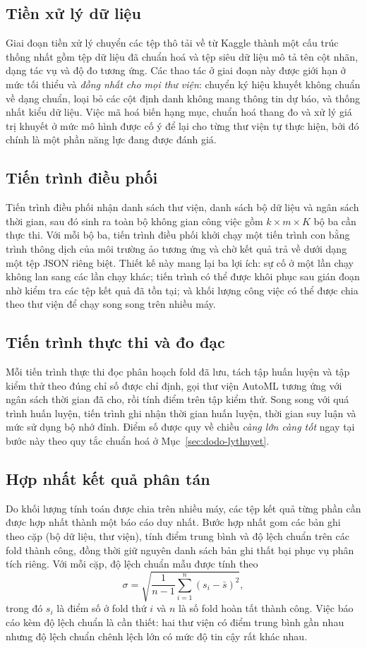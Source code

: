 \subsection{Tiền xử lý dữ liệu}
Giai đoạn tiền xử lý chuyển các tệp thô tải về từ Kaggle thành một cấu trúc thống
nhất gồm tệp dữ liệu đã chuẩn hoá và tệp siêu dữ liệu mô tả tên cột nhãn, dạng tác
vụ và độ đo tương ứng. Các thao tác ở giai đoạn này được giới hạn ở mức tối thiểu
và \emph{đồng nhất cho mọi thư viện}: chuyển ký hiệu khuyết không chuẩn về dạng
chuẩn, loại bỏ các cột định danh không mang thông tin dự báo, và thống nhất kiểu
dữ liệu. Việc mã hoá biến hạng mục, chuẩn hoá thang đo và xử lý giá trị khuyết ở
mức mô hình được cố ý để lại cho từng thư viện tự thực hiện, bởi đó chính là một
phần năng lực đang được đánh giá.

\subsection{Tiến trình điều phối}
Tiến trình điều phối nhận danh sách thư viện, danh sách bộ dữ liệu và ngân sách
thời gian, sau đó sinh ra toàn bộ không gian công việc gồm $k \times m \times K$
bộ ba cần thực thi. Với mỗi bộ ba, tiến trình điều phối khởi chạy một tiến trình
con bằng trình thông dịch của môi trường ảo tương ứng và chờ kết quả trả về dưới
dạng một tệp JSON riêng biệt. Thiết kế này mang lại ba lợi ích: sự cố ở một lần
chạy không lan sang các lần chạy khác; tiến trình có thể được khôi phục sau gián
đoạn nhờ kiểm tra các tệp kết quả đã tồn tại; và khối lượng công việc có thể được
chia theo thư viện để chạy song song trên nhiều máy.

\subsection{Tiến trình thực thi và đo đạc}
Mỗi tiến trình thực thi đọc phân hoạch fold đã lưu, tách tập huấn luyện và tập
kiểm thử theo đúng chỉ số được chỉ định, gọi thư viện AutoML tương ứng với ngân
sách thời gian đã cho, rồi tính điểm trên tập kiểm thử. Song song với quá trình
huấn luyện, tiến trình ghi nhận thời gian huấn luyện, thời gian suy luận và mức
sử dụng bộ nhớ đỉnh. Điểm số được quy về chiều \emph{càng lớn càng tốt} ngay tại
bước này theo quy tắc chuẩn hoá ở Mục~\ref{sec:dodo-lythuyet}.

\subsection{Hợp nhất kết quả phân tán}
Do khối lượng tính toán được chia trên nhiều máy, các tệp kết quả từng phần cần
được hợp nhất thành một báo cáo duy nhất. Bước hợp nhất gom các bản ghi theo cặp
(bộ dữ liệu, thư viện), tính điểm trung bình và độ lệch chuẩn trên các fold thành
công, đồng thời giữ nguyên danh sách bản ghi thất bại phục vụ phân tích riêng.
Với mỗi cặp, độ lệch chuẩn mẫu được tính theo
\[
    \sigma = \sqrt{\frac{1}{n-1}\sum_{i=1}^{n}\left(s_i - \bar{s}\right)^2},
\]
trong đó $s_i$ là điểm số ở fold thứ $i$ và $n$ là số fold hoàn tất thành công.
Việc báo cáo kèm độ lệch chuẩn là cần thiết: hai thư viện có điểm trung bình gần
nhau nhưng độ lệch chuẩn chênh lệch lớn có mức độ tin cậy rất khác nhau.

